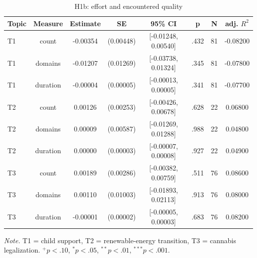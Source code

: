 \begin{table}[htbp]
\centering
\begin{threeparttable}
\caption{H1b: effort and encountered quality}
\label{tab:tab_h1b_effort_quality}
\begin{tabular}{lccccccc}
\toprule
  Topic & Measure & Estimate & SE & 95\% CI & p & N & adj. $R^2$ \\
\midrule
  T1 & count & -0.00354 & (0.00448) & [-0.01248, 0.00540] & .432 & 81 & -0.08200 \\
  T1 & domains & -0.01207 & (0.01269) & [-0.03738, 0.01324] & .345 & 81 & -0.07800 \\
  T1 & duration & -0.00004 & (0.00005) & [-0.00013, 0.00005] & .341 & 81 & -0.07700 \\
  T2 & count & 0.00126 & (0.00253) & [-0.00426, 0.00678] & .628 & 22 & 0.06800 \\
  T2 & domains & 0.00009 & (0.00587) & [-0.01269, 0.01288] & .988 & 22 & 0.04800 \\
  T2 & duration & 0.00000 & (0.00003) & [-0.00007, 0.00008] & .927 & 22 & 0.04900 \\
  T3 & count & 0.00189 & (0.00286) & [-0.00382, 0.00759] & .511 & 76 & 0.08600 \\
  T3 & domains & 0.00110 & (0.01003) & [-0.01893, 0.02113] & .913 & 76 & 0.08000 \\
  T3 & duration & -0.00001 & (0.00002) & [-0.00005, 0.00003] & .683 & 76 & 0.08200 \\
\bottomrule
\end{tabular}
\begin{tablenotes}\footnotesize\item \textit{Note.} T1 = child support, T2 = renewable-energy transition, T3 = cannabis legalization. $^{+}p<.10$, $^{*}p<.05$, $^{**}p<.01$, $^{***}p<.001$.\end{tablenotes}
\end{threeparttable}
\end{table}
